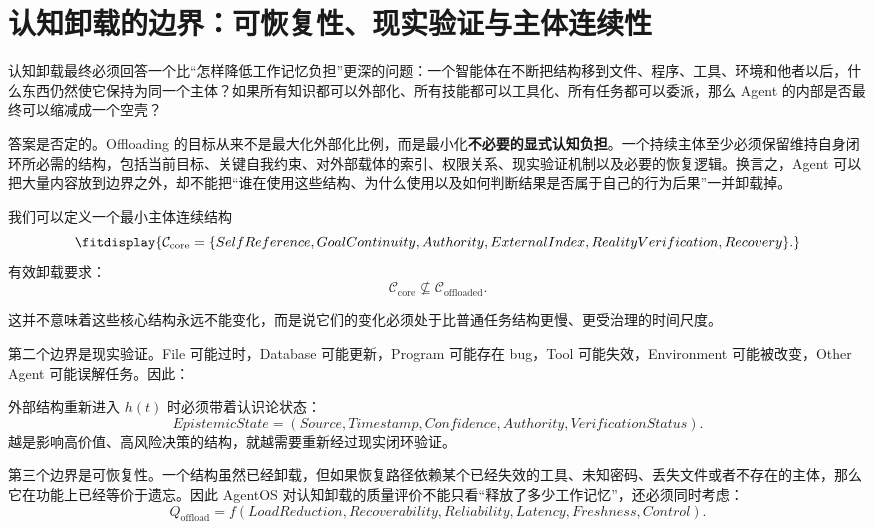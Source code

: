 \section{认知卸载的边界：可恢复性、现实验证与主体连续性}

认知卸载最终必须回答一个比“怎样降低工作记忆负担”更深的问题：一个智能体在不断把结构移到文件、程序、工具、环境和他者以后，什么东西仍然使它保持为同一个主体？如果所有知识都可以外部化、所有技能都可以工具化、所有任务都可以委派，那么 Agent 的内部是否最终可以缩减成一个空壳？

答案是否定的。Offloading 的目标从来不是最大化外部化比例，而是最小化\textbf{不必要的显式认知负担}。一个持续主体至少必须保留维持自身闭环所必需的结构，包括当前目标、关键自我约束、对外部载体的索引、权限关系、现实验证机制以及必要的恢复逻辑。换言之，Agent 可以把大量内容放到边界之外，却不能把“谁在使用这些结构、为什么使用以及如何判断结果是否属于自己的行为后果”一并卸载掉。

我们可以定义一个最小主体连续结构
\begin{equation}
\fitdisplay{
\mathcal C_{\mathrm{core}}
=
\{
SelfReference,
GoalContinuity,
Authority,
ExternalIndex,
RealityVerification,
Recovery
\}.
}
\end{equation}
有效卸载要求：
\begin{equation}
\mathcal C_{\mathrm{core}}
\nsubseteq
\mathcal C_{\mathrm{offloaded}}.
\end{equation}

这并不意味着这些核心结构永远不能变化，而是说它们的变化必须处于比普通任务结构更慢、更受治理的时间尺度。

第二个边界是现实验证。File 可能过时，Database 可能更新，Program 可能存在 bug，Tool 可能失效，Environment 可能被改变，Other Agent 可能误解任务。因此：
\begin{statementbox}
\centering
{}
\end{statementbox}
外部结构重新进入 $h(t)$ 时必须带着认识论状态：
\begin{equation}
EpistemicState
=
(
Source,
Timestamp,
Confidence,
Authority,
VerificationStatus
).
\end{equation}
越是影响高价值、高风险决策的结构，就越需要重新经过现实闭环验证。

第三个边界是可恢复性。一个结构虽然已经卸载，但如果恢复路径依赖某个已经失效的工具、未知密码、丢失文件或者不存在的主体，那么它在功能上已经等价于遗忘。因此 AgentOS 对认知卸载的质量评价不能只看“释放了多少工作记忆”，还必须同时考虑：
\begin{equation}
Q_{\mathrm{offload}}
=
f(
LoadReduction,
Recoverability,
Reliability,
Latency,
Freshness,
Control
).
\end{equation}

